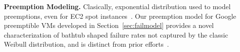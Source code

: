 




\noindent \textbf{Preemption Modeling.}
Clasically, exponential distribution used to model preemptions, even for EC2 spot instances~\cite{bid-cloud, flint, hotcloud-not-bid}. 
Our preemption model for Google preemptible VMs developed in Section~\ref{sec:failmodel} provides a novel characterization of bathtub shaped failure rates not captured by the classic Weibull distribution, and is distinct from prior efforts~\cite{mudholkar1993exponentiated, crevecoeur1993model}. 










